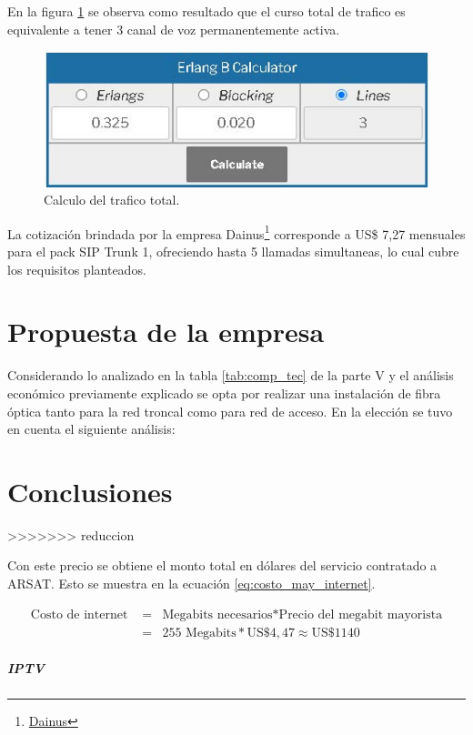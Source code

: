 \documentclass[11pt,a4paper]{article}
\begin{document}
En la figura \ref{fig:erla} se observa como resultado que el curso total de trafico es equivalente a tener 3 canal de voz permanentemente activa. 

\begin{figure}[htbp]
  \centering
  \includegraphics[width=0.6\linewidth]{fotos_julian/erlang}
  \caption{Calculo del trafico total.}
  \label{fig:erla}
\end{figure}

La cotización brindada por la empresa Dainus\footnote{\href{https://dainus.net/sip}{Dainus}} corresponde a US\$ 7,27 mensuales para el pack SIP Trunk 1, ofreciendo hasta 5 llamadas simultaneas, lo cual cubre los requisitos planteados.   



\part{Propuesta de la empresa}

Considerando lo analizado en la tabla \ref{tab:comp_tec} de la parte V y el análisis económico previamente explicado se opta por realizar una instalación de fibra óptica tanto para la red troncal como para red de acceso.
En la elección se tuvo en cuenta el siguiente análisis: 


\part{Conclusiones}
>>>>>>> reduccion

Con este precio se obtiene el monto total en dólares del servicio contratado a ARSAT. 
Esto se muestra en la ecuación \ref{eq:costo_may_internet}.

\begin{eqnarray}
    \text{Costo de internet }&=&\text{Megabits necesarios}*\text{Precio del megabit mayorista}\\
    &=&255\text{ Megabits}*\text{US}\$4,47\approx\text{US}\$1140 \nonumber
    \label{eq:costo_may_internet}
\end{eqnarray}

\subsubsection{IPTV}
\end{document}
